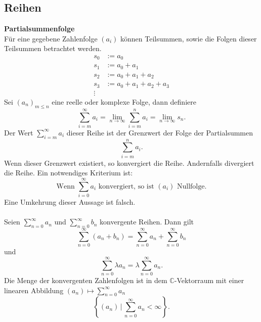 \documentclass[a4paper,12pt]{article}
\numberwithin{equation}{section}
\begin{document}
\subsection{Reihen}
\textbf{Partialsummenfolge}\\ 
Für eine gegebene Zahlenfolge $\left(a_i\right)$ können Teilsummen, sowie die Folgen dieser Teilsummen betrachtet werden.
\begin{align*}
        s_0&:=a_0\\
        s_1&:=a_0+a_1\\
        s_2&:=a_0+a_1+a_2\\
        s_3&:=a_0+a_1+a_2+a_3\\
        \vdots&
\end{align*}
Sei $\left(a_n\right)_{m\leq n}$ eine reelle oder komplexe Folge, dann definiere
\[ 
        \sum_{i=m}^{\infty}a_i=\lim_{n\rightarrow \infty}\sum_{i=m}^{n}a_i=\lim_{n\rightarrow \infty}s_n
.\] 
Der Wert $\sum_{i=m}^{\infty}a_i$ dieser Reihe ist der Grenzwert der Folge der Partialsummen
\[ 
        \sum_{i=m}^{n}a_i
.\] 
Wenn dieser Grenzwert existiert, so konvergiert die Reihe. Andernfalls divergiert die Reihe. Ein notwendiges Kriterium ist:
\[ 
        \text{Wenn }\sum_{i=0}^{\infty}a_i\text{ konvergiert, so ist }\left(a_i\right)\text{ Nullfolge}
.\] 
Eine Umkehrung dieser Aussage ist falsch.\\\\
Seien $\sum_{n=0}^{\infty}a_n$ und $\sum_{n=0}^{\infty}b_n$ konvergente Reihen. Dann gilt
\[ 
        \sum_{n=0}^{\infty}\left(a_n+b_n\right)=\sum_{n=0}^{\infty}a_n+\sum_{n=0}^{\infty}b_n
\] 
und
\[ 
        \sum_{n=0}^{\infty}\lambda a_n=\lambda \sum_{n=0}^{\infty}a_n
.\] 
Die Menge der konvergenten Zahlenfolgen ist in dem $\mathbb{C}$-Vektorraum mit einer linearen Abbildung $\left(a_n\right)\mapsto\sum_{n=0}^{\infty}a_n$ 
\[ 
        \left\{\left(a_n\right)\,|\, \sum_{n=0}^{\infty}a_n<\infty\right\}
.\] 
\end{document}

